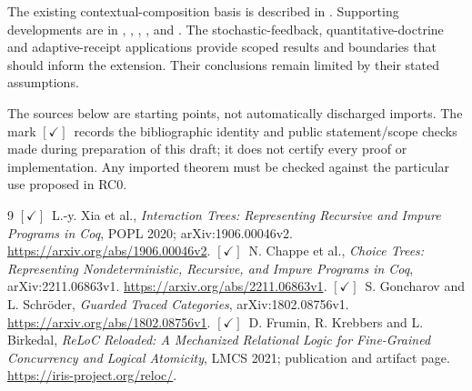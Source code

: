 \documentclass[11pt,a4paper]{article}
\newcommand{\checked}{\ensuremath{[\checkmark]}}
\begin{document}
The existing contextual-composition basis is described in . Supporting developments are in , , , ,  and . The stochastic-feedback, quantitative-doctrine and adaptive-receipt applications provide scoped results and boundaries that should inform the extension. Their conclusions remain limited by their stated assumptions.

The sources below are starting points, not automatically discharged imports. The mark \checked\ records the bibliographic identity and public statement/scope checks made during preparation of this draft; it does not certify every proof or implementation. Any imported theorem must be checked against the particular use proposed in RC0.

\begin{thebibliography}{9}
 \checked\ L.-y. Xia et al., \emph{Interaction Trees: Representing Recursive and Impure Programs in Coq}, POPL 2020; arXiv:1906.00046v2. \url{https://arxiv.org/abs/1906.00046v2}.
 \checked\ N. Chappe et al., \emph{Choice Trees: Representing Nondeterministic, Recursive, and Impure Programs in Coq}, arXiv:2211.06863v1. \url{https://arxiv.org/abs/2211.06863v1}.
 \checked\ S. Goncharov and L. Schr\"oder, \emph{Guarded Traced Categories}, arXiv:1802.08756v1. \url{https://arxiv.org/abs/1802.08756v1}.
 \checked\ D. Frumin, R. Krebbers and L. Birkedal, \emph{ReLoC Reloaded: A Mechanized Relational Logic for Fine-Grained Concurrency and Logical Atomicity}, LMCS 2021; publication and artifact page. \url{https://iris-project.org/reloc/}.
\end{thebibliography}
\end{document}
